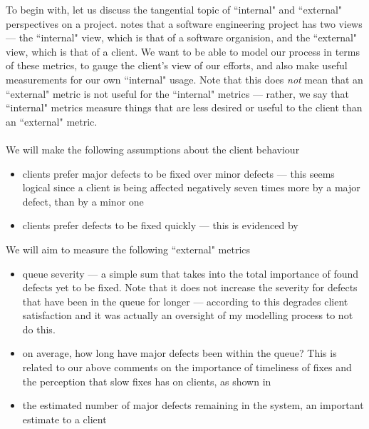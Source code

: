 To begin with, let us discuss the tangential topic of ``internal" and ``external"
perspectives on a project.
\FIXME notes that a software engineering project has two views --- the ``internal" view, which is
that of a software organision, and the ``external" view, which is that of a client.
We want to be able to model our process in terms of these metrics, to gauge the client's view of our
efforts, and also make useful measurements for our own ``internal" usage.
Note that this does {\em not} mean that an ``external" metric is not useful for the ``internal"
metrics --- rather, we say that ``internal" metrics measure things that are less desired or useful
to the client than an ``external" metric.\\
\\
We will make the following assumptions about the client behaviour
\begin{itemize}
	\item clients prefer major defects to be fixed over minor defects --- this seems logical since a
client is being affected negatively seven times more by a major defect, than by a minor one
	\item clients prefer defects to be fixed quickly --- this is evidenced by \FIXME
\end{itemize}

We will aim to measure the following ``external" metrics
\begin{itemize}
	\item queue severity --- a simple sum that takes into the total importance of found defects yet to
be fixed.
	Note that it does not increase the severity for defects that have been in the queue for longer ---
according to \FIXME this degrades client satisfaction and it was actually an oversight of my
modelling process to not do this.
	\item on average, how long have major defects been within the queue?
	This is related to our above comments on the importance of timeliness of fixes and the perception
that slow fixes has on clients, as shown in \FIXME
	\item the estimated number of major defects remaining in the system, an important estimate to a
client
\end{itemize}

